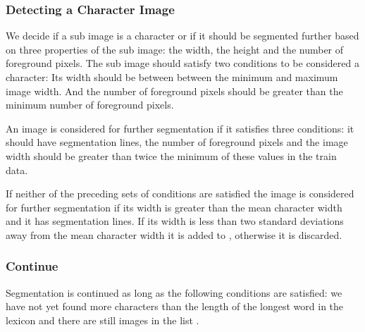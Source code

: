 \subsubsection{Detecting a Character Image}
\label{sss:method:segmentaton:segmentfurther}
	We decide if a sub image is a character or if it should be segmented further based on three properties of the sub image: the width, the height and the number of foreground pixels. The sub image should satisfy two conditions to be considered a character: Its width should be between between the minimum and maximum image width. And the number of foreground pixels should be greater than the minimum number of foreground pixels.

	An image is considered for further segmentation if it satisfies three conditions: it should have segmentation lines, the number of foreground pixels and the image width should be greater than twice the minimum of these values in the train data.

	If neither of the preceding sets of conditions are satisfied the image is considered for further segmentation if its width is greater than the mean character width and it has segmentation lines. If its width is less than two standard deviations away from the mean character width it is added to \characters, otherwise it is discarded.

\subsubsection{Continue}
\label{sss:method:segmentaton:termination}
	Segmentation is continued as long as the following conditions are satisfied: we have not yet found more characters than the length of the longest word in the lexicon and there are still images in the list \segmentfurther. 